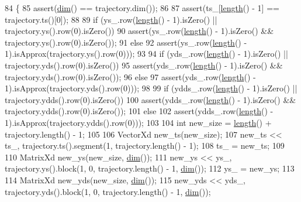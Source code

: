 \begin{DoxyCode}
84 \{
85   assert(\hyperlink{classDmpBbo_1_1Trajectory_a6f628f7f4ed9d77bf69f5b8560b98f18}{dim}() == trajectory.dim());
86 
87   assert(ts\_[\hyperlink{classDmpBbo_1_1Trajectory_a7811beb090dc6ad38f0876f6b0fdc832}{length}() - 1] == trajectory.ts()[0]);
88 
89   \textcolor{keywordflow}{if} (ys\_.row(\hyperlink{classDmpBbo_1_1Trajectory_a7811beb090dc6ad38f0876f6b0fdc832}{length}() - 1).isZero() || trajectory.ys().row(0).isZero())
90     assert(ys\_.row(\hyperlink{classDmpBbo_1_1Trajectory_a7811beb090dc6ad38f0876f6b0fdc832}{length}() - 1).isZero() && trajectory.ys().row(0).isZero());
91   \textcolor{keywordflow}{else}
92     assert(ys\_.row(\hyperlink{classDmpBbo_1_1Trajectory_a7811beb090dc6ad38f0876f6b0fdc832}{length}() - 1).isApprox(trajectory.ys().row(0)));
93 
94   \textcolor{keywordflow}{if} (yds\_.row(\hyperlink{classDmpBbo_1_1Trajectory_a7811beb090dc6ad38f0876f6b0fdc832}{length}() - 1).isZero() || trajectory.yds().row(0).isZero())
95     assert(yds\_.row(\hyperlink{classDmpBbo_1_1Trajectory_a7811beb090dc6ad38f0876f6b0fdc832}{length}() - 1).isZero() && trajectory.yds().row(0).isZero());
96   \textcolor{keywordflow}{else}
97     assert(yds\_.row(\hyperlink{classDmpBbo_1_1Trajectory_a7811beb090dc6ad38f0876f6b0fdc832}{length}() - 1).isApprox(trajectory.yds().row(0)));
98 
99   \textcolor{keywordflow}{if} (ydds\_.row(\hyperlink{classDmpBbo_1_1Trajectory_a7811beb090dc6ad38f0876f6b0fdc832}{length}() - 1).isZero() || trajectory.ydds().row(0).isZero())
100     assert(ydds\_.row(\hyperlink{classDmpBbo_1_1Trajectory_a7811beb090dc6ad38f0876f6b0fdc832}{length}() - 1).isZero() && trajectory.ydds().row(0).isZero());
101   \textcolor{keywordflow}{else}
102     assert(ydds\_.row(\hyperlink{classDmpBbo_1_1Trajectory_a7811beb090dc6ad38f0876f6b0fdc832}{length}() - 1).isApprox(trajectory.ydds().row(0)));
103 
104   \textcolor{keywordtype}{int} new\_size = \hyperlink{classDmpBbo_1_1Trajectory_a7811beb090dc6ad38f0876f6b0fdc832}{length}() + trajectory.length() - 1;
105 
106   VectorXd new\_ts(new\_size);
107   new\_ts << ts\_, trajectory.ts().segment(1, trajectory.length() - 1);
108   ts\_ = new\_ts;
109 
110   MatrixXd new\_ys(new\_size, \hyperlink{classDmpBbo_1_1Trajectory_a6f628f7f4ed9d77bf69f5b8560b98f18}{dim}());
111   new\_ys << ys\_, trajectory.ys().block(1, 0, trajectory.length() - 1, \hyperlink{classDmpBbo_1_1Trajectory_a6f628f7f4ed9d77bf69f5b8560b98f18}{dim}());
112   ys\_ = new\_ys;
113 
114   MatrixXd new\_yds(new\_size, \hyperlink{classDmpBbo_1_1Trajectory_a6f628f7f4ed9d77bf69f5b8560b98f18}{dim}());
115   new\_yds << yds\_, trajectory.yds().block(1, 0, trajectory.length() - 1, \hyperlink{classDmpBbo_1_1Trajectory_a6f628f7f4ed9d77bf69f5b8560b98f18}{dim}());

\end{DoxyCode}
